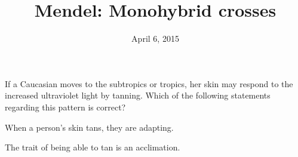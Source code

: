 





\title[Mendel: Monohybrid crosses]{Mendel: Monohybrid crosses}
\date{April 6, 2015}



\begin{noheadline}
\maketitle
\end{noheadline}


\begin{noheadline}
\begin{frame}
    \begin{clickerquestion}
        \item If a Caucasian moves to the subtropics or tropics, her skin may
            respond to the increased ultraviolet light by tanning. Which of the
            following statements regarding this pattern is correct?
        \begin{clickeroptions}
            \item When a person's skin tans, they are adapting.
            \item {}
            \item The trait of being able to tan is an acclimation.
            \item {}
        \end{clickeroptions}
    \end{clickerquestion}
\end{frame}
\end{noheadline}

